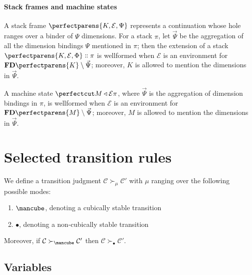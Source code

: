 \documentclass{article}
\newcommand\Clo[2]{#1\triangleleft{#2}}
\newcommand\Cons[2]{{#1}\dblcolon{#2}}
\newcommand\FreeDims[1]{\mathbf{FD}\perfectparens{#1}}
\newcommand\Frame[3]{\perfectparens{#1,#2,#3}}
\newcommand\Cfg[3]{\cut{\Clo{#1}{#2}}{#3}}
\newcommand\Stable{\text{\mancube}}
\newcommand\NonStable{\bullet}
\newcommand\Step[3]{{#2}\mathrel{\succ_{#1}}{#3}}
\newcommand\Meta[1]{\mathbb{#1}}
\begin{document}
\paragraph{Stack frames and machine states}

A stack frame $\Frame{K}{\mathcal{E}}{\Psi}$ represents a continuation
whose hole ranges over a binder of $\Psi$ dimensions. For a stack
$\pi$, let $\vec{\Psi}$ be the aggregation of all the dimension
bindings $\Psi$ mentioned in $\pi$; then the extension of a stack
$\Cons{\Frame{K}{\mathcal{E}}{\Phi}}{\pi}$ is wellformed when
$\mathcal{E}$ is an environment for $\FreeDims{K}\setminus\vec{\Psi}$;
moreover, $K$ is allowed to mention the dimensions in $\vec{\Psi}$.

A machine state $\Cfg{M}{\mathcal{E}}{\pi}$, where $\vec{\Psi}$ is the
aggregation of dimension bindings in $\pi$, is wellformed when
$\mathcal{E}$ is an environment for $\FreeDims{M}\setminus\vec{\Psi}$;
moreover, $M$ is allowed to mention the dimensions in $\vec{\Psi}$.

\section{Selected transition rules}

We define a transition judgment
$\Step{\mu}{\mathcal{C}}{\mathcal{C}'}$ with $\mu$ ranging over
the following possible modes:
\begin{enumerate}
\item $\Stable$, denoting a cubically stable transition
\item $\NonStable$, denoting a non-cubically stable transition
\end{enumerate}

Moreover, if $\Step{\Stable}{\mathcal{C}}{\mathcal{C}'}$ then
$\Step{\NonStable}{\mathcal{C}}{\mathcal{C}'}$.

\subsection{Variables}

\end{document}
